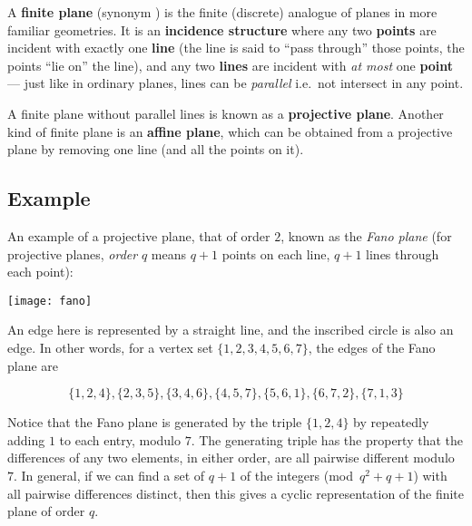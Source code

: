 \documentclass[12pt]{article}
\begin{document}

A {\bf finite plane} (synonym {\bf {}}) is the finite (discrete) analogue of planes in more familiar geometries. It is an {\bf incidence structure} where any two {\bf points} are incident with exactly one {\bf line} (the line is said to ``pass through'' those points, the points ``lie on'' the line), and any two {\bf lines} are incident with {\em at most\/} one {\bf point} --- just like in ordinary planes, lines can be {\em parallel\/} i.e.\ not intersect in any point.

A finite plane without parallel lines is known as a {\bf projective plane}. Another kind of finite plane is an {\bf affine plane}, which can be obtained from a projective plane by removing one line (and all the points on it).

\subsection*{Example}

An example of a projective plane, that of order $2$, known as the \emph{Fano plane} (for projective planes, {\em order\/} $q$ means $q+1$ points on each line, $q+1$ lines through each point):

\begin{center}
\texttt{[image: fano]}
\end{center}

An edge here is represented by a straight line, and the inscribed circle is also an edge.  In other words, for a vertex set $\{1, 2, 3, 4, 5, 6, 7 \}$, the edges of the Fano plane are

$$
\{1, 2, 4 \}, 
\{2, 3, 5 \},
\{3, 4, 6 \},
\{4, 5, 7 \},
\{5, 6, 1 \},
\{6, 7, 2 \},
\{7, 1, 3 \} 
$$

Notice that the Fano plane is generated by the triple $\{1, 2, 4\}$
by repeatedly adding $1$ to each entry, modulo $7$.  The generating triple has the property that the differences of any two elements, in either order, are all
pairwise different modulo $7$.  In general, if we can find a set of $q+1$
of the integers (mod~$q^2 + q + 1$) with all pairwise differences distinct,
then this gives a cyclic representation of the finite plane of order $q$.
\end{document}

